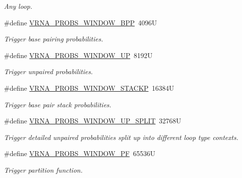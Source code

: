 \begin{DoxyCompactItemize}
\begin{DoxyCompactList}\small\item\em Any loop. \end{DoxyCompactList}\item 
\#define \hyperlink{group__part__func__window_ga296217b76e76e5f7e6927e7210aa9b1f}{V\+R\+N\+A\+\_\+\+P\+R\+O\+B\+S\+\_\+\+W\+I\+N\+D\+O\+W\+\_\+\+B\+PP}~4096U
\begin{DoxyCompactList}\small\item\em Trigger base pairing probabilities. \end{DoxyCompactList}\item 
\#define \hyperlink{group__part__func__window_ga18325811c7dfc7b7d9d4ac37f4353615}{V\+R\+N\+A\+\_\+\+P\+R\+O\+B\+S\+\_\+\+W\+I\+N\+D\+O\+W\+\_\+\+UP}~8192U
\begin{DoxyCompactList}\small\item\em Trigger unpaired probabilities. \end{DoxyCompactList}\item 
\#define \hyperlink{group__part__func__window_ga0a13fc668b02f21b225e2334e4caac08}{V\+R\+N\+A\+\_\+\+P\+R\+O\+B\+S\+\_\+\+W\+I\+N\+D\+O\+W\+\_\+\+S\+T\+A\+C\+KP}~16384U
\begin{DoxyCompactList}\small\item\em Trigger base pair stack probabilities. \end{DoxyCompactList}\item 
\#define \hyperlink{group__part__func__window_ga9068f4ec008bf1c042a9357f5c2c5e13}{V\+R\+N\+A\+\_\+\+P\+R\+O\+B\+S\+\_\+\+W\+I\+N\+D\+O\+W\+\_\+\+U\+P\+\_\+\+S\+P\+L\+IT}~32768U
\begin{DoxyCompactList}\small\item\em Trigger detailed unpaired probabilities split up into different loop type contexts. \end{DoxyCompactList}\item 
\#define \hyperlink{group__part__func__window_ga4b79137d9b28b1f9cac7983792ce34a0}{V\+R\+N\+A\+\_\+\+P\+R\+O\+B\+S\+\_\+\+W\+I\+N\+D\+O\+W\+\_\+\+PF}~65536U
\begin{DoxyCompactList}\small\item\em Trigger partition function. \end{DoxyCompactList}\end{DoxyCompactItemize}
